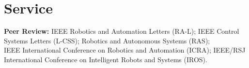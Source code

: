 \documentclass[letterpaper,11pt]{article}
\begin{document}
\section{Service}
{\small
\textbf{Peer Review:} IEEE Robotics and Automation Letters (RA-L); IEEE Control Systems Letters (L-CSS); Robotics and Autonomous Systems (RAS);\\
IEEE International Conference on Robotics and Automation (ICRA); IEEE/RSJ International Conference on Intelligent Robots and Systems (IROS).\par}
\end{document}
